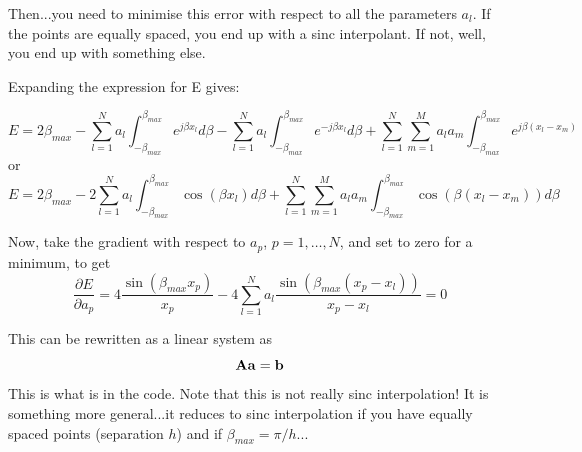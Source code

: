 \documentclass[dvipsnames]{article}
\begin{document}
Then...you need to minimise this error with respect to all the parameters $a_{l}$. If the points are equally spaced, you end up with a sinc interpolant. If not, well, you end up with something else. 

Expanding the expression for E gives:

\begin{equation}
E = 2\beta_{max}-\sum_{l=1}^{N}a_{l}\int_{-\beta_{max}}^{\beta_{max}}e^{j\beta x_{l}}d\beta-\sum_{l=1}^{N}a_{l}\int_{-\beta_{max}}^{\beta_{max}}e^{-j\beta x_{l}}d\beta+\sum_{l=1}^{N}\sum_{m=1}^{M}a_{l}a_{m}\int_{-\beta_{max}}^{\beta_{max}}e^{j\beta\left(x_{l}-x_{m}\right)}
\end{equation}
or
\begin{equation}
E = 2\beta_{max}-2\sum_{l=1}^{N}a_{l}\int_{-\beta_{max}}^{\beta_{max}}\cos(\beta x_{l})d\beta+\sum_{l=1}^{N}\sum_{m=1}^{M}a_{l}a_{m}\int_{-\beta_{max}}^{\beta_{max}}\cos(\beta\left(x_{l}-x_{m}\right))d\beta
\end{equation}

Now, take the gradient with respect to $a_{p}$, $p=1,\hdots,N$, and set to zero for a minimum, to get
\begin{equation}
\frac{\partial E}{\partial a_{p}} = 4\frac{\sin(\beta_{max} x_{p})}{x_{p}}-4\sum_{l=1}^{N}a_{l}\frac{\sin(\beta_{max} \left(x_{p}-x_{l}\right))}{x_{p}-x_{l}} = 0
\end{equation}

This can be rewritten as a linear system as
\begin{equation}
    {\bf A}{\bf a} = {\bf b}
\end{equation}
This is what is in the code. Note that this is not really sinc interpolation! It is something more general...it reduces to sinc interpolation if you have equally spaced points (separation $h$) and if $\beta_{max} = \pi/h$...
\end{document}
